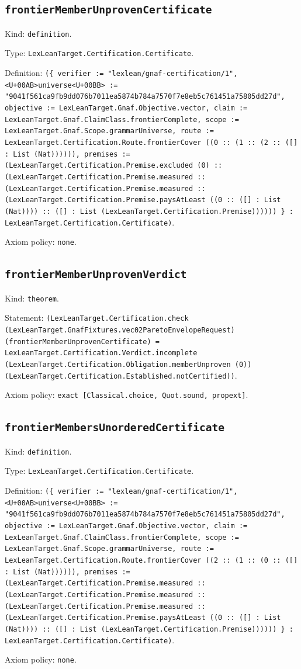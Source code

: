 \documentclass[11pt]{article}
\begin{document}
\subsection*{\texttt{frontierMemberUnprovenCertificate}}
\noindent Kind: \texttt{definition}.\par
\noindent Type: \texttt{LexLeanTarget.Certification.Certificate}.\par
\noindent Definition: \texttt{(\{ verifier := "lexlean/gnaf-certification/1", <U+00AB>universe<U+00BB> := "9041f561ca9fb9dd076b7011ea5874b784a7570f7e8eb5c761451a75805dd27d", objective := LexLeanTarget.Gnaf.Objective.vector, claim := LexLeanTarget.Gnaf.ClaimClass.frontierComplete, scope := LexLeanTarget.Gnaf.Scope.grammarUniverse, route := LexLeanTarget.Certification.Route.frontierCover ((0 :: (1 :: (2 :: ([] : List (Nat)))))), premises := (LexLeanTarget.Certification.Premise.excluded (0) :: (LexLeanTarget.Certification.Premise.measured :: (LexLeanTarget.Certification.Premise.measured :: (LexLeanTarget.Certification.Premise.paysAtLeast ((0 :: ([] : List (Nat)))) :: ([] : List (LexLeanTarget.Certification.Premise)))))) \} : LexLeanTarget.Certification.Certificate)}.\par
\noindent Axiom policy: \texttt{none}.\par
\subsection*{\texttt{frontierMemberUnprovenVerdict}}
\noindent Kind: \texttt{theorem}.\par
\noindent Statement: \texttt{(LexLeanTarget.Certification.check (LexLeanTarget.GnafFixtures.vec02ParetoEnvelopeRequest) (frontierMemberUnprovenCertificate) = LexLeanTarget.Certification.Verdict.incomplete (LexLeanTarget.Certification.Obligation.memberUnproven (0)) (LexLeanTarget.Certification.Established.notCertified))}.\par
\noindent Axiom policy: \texttt{exact [Classical.choice, Quot.sound, propext]}.\par
\subsection*{\texttt{frontierMembersUnorderedCertificate}}
\noindent Kind: \texttt{definition}.\par
\noindent Type: \texttt{LexLeanTarget.Certification.Certificate}.\par
\noindent Definition: \texttt{(\{ verifier := "lexlean/gnaf-certification/1", <U+00AB>universe<U+00BB> := "9041f561ca9fb9dd076b7011ea5874b784a7570f7e8eb5c761451a75805dd27d", objective := LexLeanTarget.Gnaf.Objective.vector, claim := LexLeanTarget.Gnaf.ClaimClass.frontierComplete, scope := LexLeanTarget.Gnaf.Scope.grammarUniverse, route := LexLeanTarget.Certification.Route.frontierCover ((2 :: (1 :: (0 :: ([] : List (Nat)))))), premises := (LexLeanTarget.Certification.Premise.measured :: (LexLeanTarget.Certification.Premise.measured :: (LexLeanTarget.Certification.Premise.measured :: (LexLeanTarget.Certification.Premise.paysAtLeast ((0 :: ([] : List (Nat)))) :: ([] : List (LexLeanTarget.Certification.Premise)))))) \} : LexLeanTarget.Certification.Certificate)}.\par
\noindent Axiom policy: \texttt{none}.\par
\end{document}
